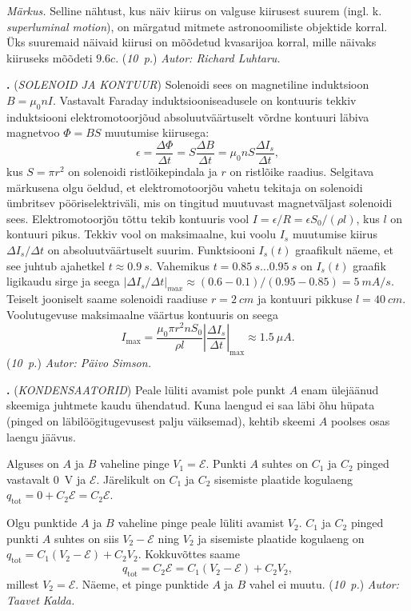 \documentclass[12pt,a5paper]{article}
\newcommand{\numb}[1]{\vspace{5pt}\textbf{\large #1}}
\newcommand{\nimi}[1]{(\textsl{\small #1})}
\newcommand{\punktid}[1]{(\emph{#1~p.})}
\newcommand{\autor}[1]{\emph{ Autor: #1.}}
\newcounter{ylesanne}
\newcommand{\yl}[1]{\addtocounter{ylesanne}{1}\numb{\theylesanne.} \nimi{#1} \newblock{}}
\begin{document}
\textit{Märkus.} Selline nähtust, kus näiv kiirus on valguse kiirusest suurem (ingl. k. \textit{superluminal motion}), on märgatud mitmete astronoomiliste objektide korral. Üks suuremaid näivaid kiirusi on mõõdetud kvasarijoa korral, mille näivaks kiiruseks mõõdeti $\num{9.6}c$.
\punktid{10} \autor{Richard Luhtaru}


\yl{SOLENOID JA KONTUUR}
Solenoidi sees on magnetiline induktsioon $B = \mu_0 nI$. Vastavalt Faraday induktsiooniseadusele on kontuuris tekkiv induktsiooni elektromotoorjõud absoluutväärtuselt võrdne kontuuri läbiva magnetvoo $\Phi=BS$ muutumise kiirusega:
\[
\epsilon=\frac{\Delta \Phi}{\Delta t}=S\frac{\Delta B}{\Delta t}=\mu_0 n S \frac{\Delta I_s}{\Delta t},
\]
kus $S=\pi r^2$ on solenoidi ristlõikepindala ja $r$ on ristlõike raadius. Selgitava märkusena olgu öeldud, et elektromotoorjõu vahetu tekitaja on solenoidi ümbritsev pööriselektriväli, mis on tingitud muutuvast magnetväljast solenoidi sees. Elektromotoorjõu tõttu tekib kontuuris vool $I=\epsilon/R =\epsilon S_0/(\rho l)$, kus $l$ on kontuuri pikus.
Tekkiv vool on maksimaalne, kui voolu $I_s$ muutumise kiirus $\Delta I_s/\Delta t$ on absoluutväärtuselt suurim. Funktsiooni $I_s(t)$ graafikult näeme, et see juhtub ajahetkel $t\approx \SI{0,9}{s}$. Vahemikus 
$t=\SI{0.85}{s} \ldots \SI{0.95}{s}$ on $I_s(t)$ graafik ligikaudu sirge ja seega $|\Delta I_s/\Delta t|_{max} \approx (\num{0,6}-\num{0,1})/(\num{0,95}-\num{0,85})=\SI{5}{mA/s}$. Teiselt jooniselt saame solenoidi raadiuse $r=\SI{2}{cm}$ ja kontuuri pikkuse $l=\SI{40}{cm}$. Voolutugevuse maksimaalne väärtus kontuuris on seega
\[
I_{\mathrm{max}}=\frac{\mu_0 \pi r^2 n S_0 }{\rho l}\left|\frac{\Delta I_s}{\Delta t}\right|_{\mathrm{max}}\approx \SI{1,5}{\mu A}.
\]
\punktid{10} \autor{Päivo Simson}


\yl{KONDENSAATORID}
Peale lüliti avamist pole punkt $A$ enam ülejäänud skeemiga juhtmete kaudu ühendatud. Kuna laengud ei saa läbi õhu hüpata (pinged on läbilöögitugevusest palju väiksemad), kehtib skeemi $A$ poolses osas laengu jäävus.

Alguses on $A$ ja $B$ vaheline pinge $V_1 = \mathcal E$. Punkti $A$ suhtes on $C_1$ ja $C_2$ pinged vastavalt \SI{0}{V} ja $\mathcal E$. Järelikult on $C_1$ ja $C_2$ sisemiste plaatide kogulaeng $q_\mathrm{tot} = 0 + C_2\mathcal E = C_2\mathcal E$.

Olgu punktide $A$ ja $B$ vaheline pinge peale lüliti avamist $V_2$. $C_1$ ja $C_2$ pinged punkti $A$ suhtes on siis $V_2 - \mathcal E$ ning $V_2$ ja sisemiste plaatide kogulaeng on $q_\mathrm{tot} = C_1(V_2 - \mathcal E) + C_2V_2$. Kokkuvõttes saame
\[
q_\mathrm{tot} = C_2\mathcal E = C_1(V_2 - \mathcal E) + C_2V_2,
\]
millest $V_2=\mathcal E$. Näeme, et pinge punktide $A$ ja $B$ vahel ei muutu.
\punktid{10} \autor{Taavet Kalda}
\end{document}
